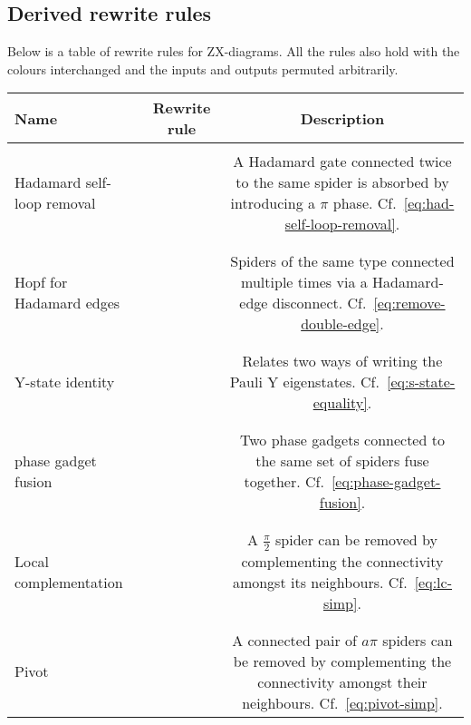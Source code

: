 \documentclass[a4paper,onecolumn,superscriptaddress,11pt,%
				unpublished,%
				allowfontchageintitle,%
				]{quantumarticle}
\begin{document}
\clearpage
\subsection{Derived rewrite rules}


Below is a table of rewrite rules for ZX-diagrams. All the rules also hold with the colours interchanged and the inputs and outputs permuted arbitrarily.

\begin{changemargin}{-3cm}{-3cm}
\begin{tabular}{l|c|c}
Name & Rewrite rule & Description \\
\hline
\hline
&&\\
\parbox{3cm}{Hadamard self-loop removal} &  & \parbox{5cm}{A Hadamard gate connected twice to the same spider is absorbed by introducing a $\pi$ phase. Cf.~\eqref{eq:had-self-loop-removal}.}
\\&& \\[0cm] \hline && \\
\parbox{3cm}{Hopf for Hadamard edges} &  & \parbox{5cm}{Spiders of the same type connected multiple times via a Hadamard-edge disconnect. Cf.~\eqref{eq:remove-double-edge}.}
\\&& \\[0cm] \hline && \\
Y-state identity &  & \parbox{5cm}{Relates two ways of writing the Pauli Y eigenstates. Cf.~\eqref{eq:s-state-equality}.}
\\&& \\[0cm] \hline && \\
\parbox{3cm}{phase gadget fusion} &  & \parbox{5cm}{Two phase gadgets connected to the same set of spiders fuse together. Cf.~\eqref{eq:phase-gadget-fusion}.} 
\\&& \\[0cm] \hline && \\
\parbox{3cm}{Local\\complementation} &  & \parbox{5cm}{A $\frac\pi2$ spider can be removed by complementing the connectivity amongst its neighbours. Cf.~\eqref{eq:lc-simp}.}
\\&& \\[0cm] \hline && \\
Pivot &  & \parbox{5cm}{A connected pair of $a\pi$ spiders can be removed by complementing the connectivity amongst their neighbours. Cf.~\eqref{eq:pivot-simp}.}
\end{tabular}

\end{changemargin}
\end{document}
